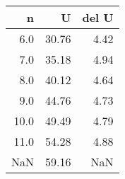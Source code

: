 \begin{tabular}{rrr}
\toprule
   n &     U &  del U \\
\midrule
 6.0 & 30.76 &   4.42 \\
 7.0 & 35.18 &   4.94 \\
 8.0 & 40.12 &   4.64 \\
 9.0 & 44.76 &   4.73 \\
10.0 & 49.49 &   4.79 \\
11.0 & 54.28 &   4.88 \\
 NaN & 59.16 &    NaN \\
\bottomrule
\end{tabular}
